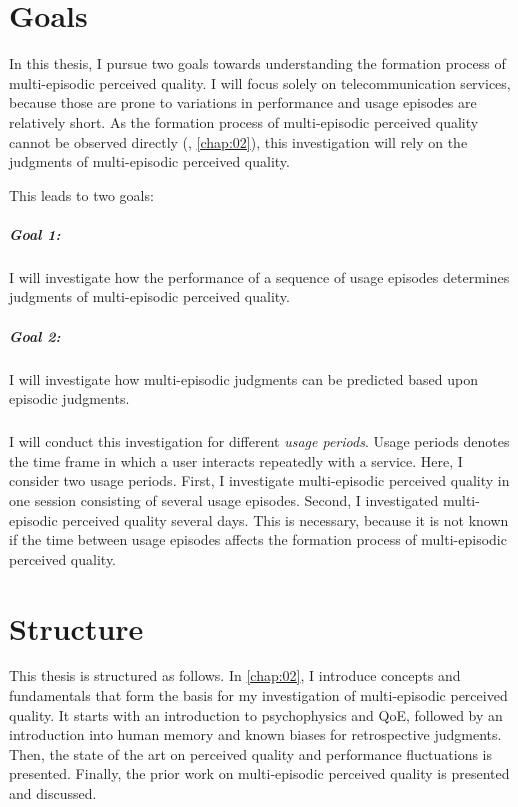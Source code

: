 
\section{Goals}
In this thesis, I pursue two goals towards understanding the formation process of multi-episodic perceived quality.
I will focus solely on telecommunication services, because those are prone to variations in performance and usage episodes are relatively short.
As the formation process of multi-episodic perceived quality cannot be observed directly (\cf, \autoref{chap:02}), this investigation will rely on the judgments of multi-episodic perceived quality.

This leads to two goals:

\subparagraph*{Goal 1:}
I will investigate how the performance of a sequence of usage episodes determines judgments of multi-episodic perceived quality.

\subparagraph*{Goal 2:}
I will investigate how multi-episodic judgments can be predicted based upon episodic judgments.

\subparagraph*{}
I will conduct this investigation for different \emph{usage periods}.
Usage periods denotes the time frame in which a user interacts repeatedly with a service.
Here, I consider two usage periods.
First, I investigate multi-episodic perceived quality in one session consisting of several usage episodes.
Second, I investigated multi-episodic perceived quality several days.
This is necessary, because it is not known if the time between usage episodes affects the formation process of multi-episodic perceived quality.

\section{Structure}
This thesis is structured as follows.
In \autoref{chap:02}, I introduce concepts and fundamentals that form the basis for my investigation of multi-episodic perceived quality.
It starts with an introduction to psychophysics and \ac{QoE}, followed by an introduction into human memory and known biases for retrospective judgments.
Then, the state of the art on perceived quality and performance fluctuations is presented.
Finally, the prior work on multi-episodic perceived quality is presented and discussed.

